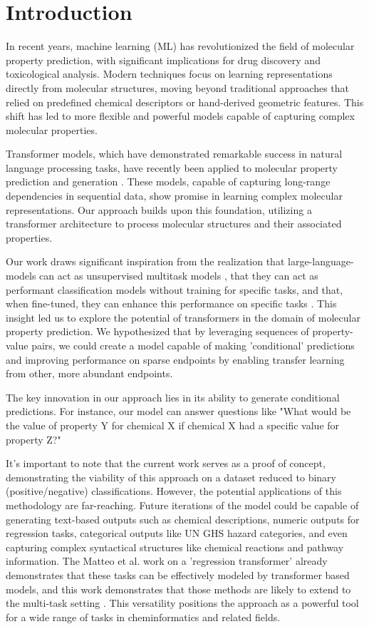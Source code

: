 \section{Introduction}

In recent years, machine learning (ML) has revolutionized the field of molecular property prediction, with significant implications for drug discovery and toxicological analysis. Modern techniques focus on learning representations directly from molecular structures, moving beyond traditional approaches that relied on predefined chemical descriptors or hand-derived geometric features. This shift has led to more flexible and powerful models capable of capturing complex molecular properties.

Transformer models, which have demonstrated remarkable success in natural language processing tasks, have recently been applied to molecular property prediction and generation \cite{molformer}. These models, capable of capturing long-range dependencies in sequential data, show promise in learning complex molecular representations. Our approach builds upon this foundation, utilizing a transformer architecture to process molecular structures and their associated properties.

Our work draws significant inspiration from the realization that large-language-models can act as unsupervised multitask models \cite{llms-are-unsuper-learners}, that they can act as performant classification models without training for specific tasks, and that, when fine-tuned, they can enhance this performance on specific tasks \cite{zero-shot-learners,bert-pretraining}. This insight led us to explore the potential of transformers in the domain of molecular property prediction. We hypothesized that by leveraging sequences of property-value pairs, we could create a model capable of making 'conditional' predictions and improving performance on sparse endpoints by enabling transfer learning from other, more abundant endpoints.

The key innovation in our approach lies in its ability to generate conditional predictions. For instance, our model can answer questions like "What would be the value of property Y for chemical X if chemical X had a specific value for property Z?" 

It's important to note that the current work serves as a proof of concept, demonstrating the viability of this approach on a dataset reduced to binary (positive/negative) classifications. However, the potential applications of this methodology are far-reaching. Future iterations of the model could be capable of generating text-based outputs such as chemical descriptions, numeric outputs for regression tasks, categorical outputs like UN GHS hazard categories, and even capturing complex syntactical structures like chemical reactions and pathway information. The Matteo et al. work on a 'regression transformer' already demonstrates that these tasks can be effectively modeled by transformer based models, and this work demonstrates that those methods are likely to extend to the multi-task setting \cite{regression-transformer}. This versatility positions the approach as a powerful tool for a wide range of tasks in cheminformatics and related fields.

